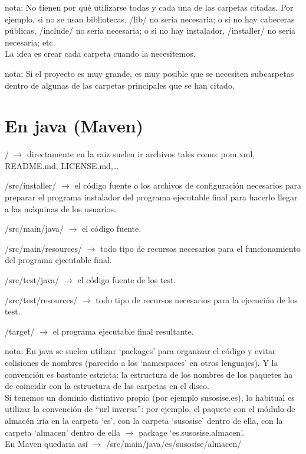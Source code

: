 \documentclass[spanish,12pt,a4paper,final,oneside]{article}
\begin{document}
\vspace{0.5cm}

nota: No tienen por qué utilizarse todas y cada una de las carpetas citadas. Por ejemplo, si no se usan bibliotecas, /lib/ no seria necesaria; o si no hay cabeceras públicas, /include/ no seria necesaria; o si no hay instalador, /installer/ no seria necesaria; etc. 
\\La idea es crear cada carpeta cuando la necesitemos.

\vspace{1cm}

nota: Si el proyecto es muy grande, es muy posible que se necesiten subcarpetas dentro de algunas de las carpetas principales que se han citado.



\section*{En java (Maven)} 

{\LARGE /} $\rightarrow$ directamente en la raiz suelen ir archivos tales como: pom.xml, README.md, LICENSE.md,\ldots 

{\LARGE /src/installer/} $\rightarrow$ el código fuente o los archivos de configuración necesarios para preparar el programa instalador del programa ejecutable final para hacerlo llegar a las máquinas de los usuarios.

{\LARGE /src/main/java/} $\rightarrow$ el código fuente.

{\LARGE /src/main/resources/} $\rightarrow$ todo tipo de recursos necesarios para el funcionamiento del programa ejecutable final.

{\LARGE /src/test/java/} $\rightarrow$ el código fuente de los test.

{\LARGE /src/test/resources/} $\rightarrow$ todo tipo de recursos necesarios para la ejecución de los test.

{\LARGE /target/} $\rightarrow$ el programa ejecutable final resultante.

\vspace{0.5cm}

nota: En java se suelen utilizar `packages' para organizar el código y evitar colisiones de nombres (parecido a los `namespaces' en otros lenguajes). Y la convención es bastante estricta: la estructura de los nombres de los paquetes ha de coincidir con la estructura de las carpetas en el disco.
\\Si tenemos un dominio distintivo propio (por ejemplo susosise.es), lo habitual es utilizar la convención de ``url inversa'': por ejemplo, el paquete con el módulo de almacén iría en la carpeta `es', con la carpeta `susosise' dentro de ella, con la carpeta `almacen' dentro de ella $\rightarrow$ package `es.susosise.almacen'.
\\En Maven quedaria así $\rightarrow$  /src/main/java/es/susosise/almacen/
\end{document}

